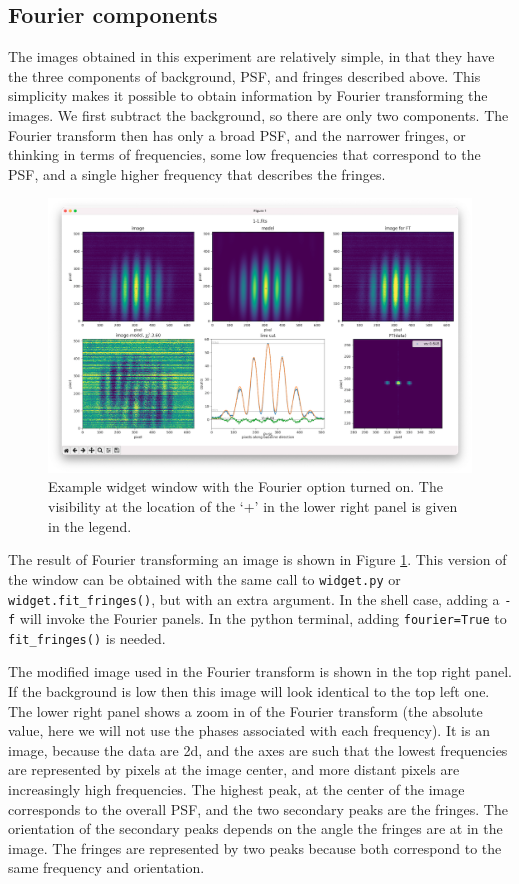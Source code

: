 \documentclass[11pt]{article}
\begin{document}
\subsection{Fourier components}\label{sec:fourier}

The images obtained in this experiment are relatively simple, in that they have the three components of background, PSF, and fringes described above. This simplicity makes it possible to obtain information by Fourier transforming the images. We first subtract the background, so there are only two components. The Fourier transform then has only a broad PSF, and the narrower fringes, or thinking in terms of frequencies, some low frequencies that correspond to the PSF, and a single higher frequency that describes the fringes.

\begin{figure}[h]
    \centering
   \includegraphics[width=1\textwidth]{widget-fourier.png}
    \caption{Example widget window with the Fourier option turned on. The visibility at the location of the `+' in the lower right panel is given in the legend.}
    \label{fig:widget-f}
\end{figure}

The result of Fourier transforming an image is shown in Figure \ref{fig:widget-f}. This version of the window can be obtained with the same call to \texttt{widget.py} or \texttt{widget.fit\_fringes()}, but with an extra argument. In the shell case, adding a \texttt{-f}  will invoke the Fourier panels. In the python terminal, adding \texttt{fourier=True} to \texttt{fit\_fringes()} is needed.

The modified image used in the Fourier transform is shown in the top right panel. If the background is low then this image will look identical to the top left one. The lower right panel shows a zoom in of the Fourier transform (the absolute value, here we will not use the phases associated with each frequency). It is an image, because the data are 2d, and the axes are such that the lowest frequencies are represented by pixels at the image center, and more distant pixels are increasingly high frequencies. The highest peak, at the center of the image corresponds to the overall PSF, and the two secondary peaks are the fringes. The orientation of the secondary peaks depends on the angle the fringes are at in the image. The fringes are represented by two peaks because both correspond to the same frequency and orientation.
\end{document}
